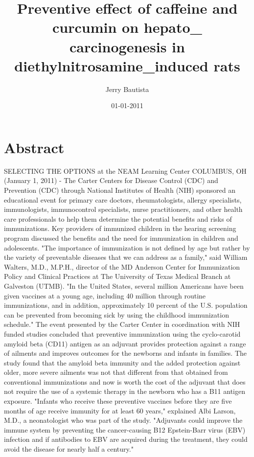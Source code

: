 \documentclass{article}%
\title{Preventive effect of caffeine and curcumin on hepato\_ carcinogenesis in diethylnitrosamine\_induced rats}%
\author{Jerry Bautista}%
\affil{Department of Genetics, Washington University School of Medicine, St. Louis, Missouri, United States of America}%
\date{01{-}01{-}2011}%
\begin{document}
%
\normalsize%
\maketitle%
\section{Abstract}%
\label{sec:Abstract}%
SELECTING THE OPTIONS at the NEAM Learning Center\newline%
COLUMBUS, OH (January 1, 2011) {-} The Carter Centers for Disease Control (CDC) and Prevention (CDC) through National Institutes of Health (NIH) sponsored an educational event for primary care doctors, rheumatologists, allergy specialists, immunologists, immunocontrol specialists, nurse practitioners, and other health care professionals to help them determine the potential benefits and risks of immunizations. Key providers of immunized children in the hearing screening program discussed the benefits and the need for immunization in children and adolescents.\newline%
"The importance of immunization is not defined by age but rather by the variety of preventable diseases that we can address as a family," said William Walters, M.D., M.P.H., director of the MD Anderson Center for Immunization Policy and Clinical Practices at The University of Texas Medical Branch at Galveston (UTMB). "In the United States, several million Americans have been given vaccines at a young age, including 40 million through routine immunizations, and in addition, approximately 10 percent of the U.S. population can be prevented from becoming sick by using the childhood immunization schedule."\newline%
The event presented by the Carter Center in coordination with NIH funded studies concluded that preventive immunization using the cyclo{-}carotid amyloid beta (CD11) antigen as an adjuvant provides protection against a range of ailments and improves outcomes for the newborns and infants in families. The study found that the amyloid beta immunity and the added protection against older, more severe ailments was not that different from that obtained from conventional immunizations and now is worth the cost of the adjuvant that does not require the use of a systemic therapy in the newborn who has a B11 antigen exposure.\newline%
"Infants who receive these preventive vaccines before they are five months of age receive immunity for at least 60 years," explained Albi Larson, M.D., a neonatologist who was part of the study. "Adjuvants could improve the immune system by preventing the cancer{-}causing B12 Epstein{-}Barr virus (EBV) infection and if antibodies to EBV are acquired during the treatment, they could avoid the disease for nearly half a century."\newline%
\end{document}
